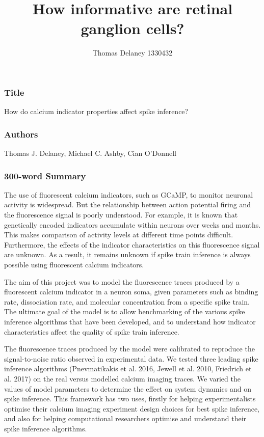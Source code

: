 \documentclass[a4paper,12pt]{article}
\title{How informative are retinal ganglion cells?}
\author{Thomas Delaney 1330432}
\theoremstyle{definition}
\begin{document}
\subsubsection*{Title}
How do calcium indicator properties affect spike inference?

\subsubsection*{Authors}
Thomas J. Delaney, Michael C. Ashby, Cian O'Donnell

\subsubsection*{300-word Summary}
The use of fluorescent calcium indicators, such as GCaMP, to monitor neuronal activity is widespread. But the relationship between action potential firing and the fluorescence signal is poorly understood. For example, it is known that genetically encoded indicators accumulate within neurons over weeks and months. This makes comparison of activity levels at different time points difficult. Furthermore, the effects of the indicator characteristics on this fluorescence signal are unknown. As a result, it remains unknown if spike train inference is always possible using fluorescent calcium indicators.

The aim of this project was to model the fluorescence traces produced by a fluorescent calcium indicator in a neuron soma, given parameters such as binding rate, dissociation rate, and molecular concentration from a specific spike train. The ultimate goal of the model is to allow benchmarking of the various spike inference algorithms that have been developed, and to understand how indicator characteristics affect the quality of spike train inference.

The fluorescence traces produced by the model were calibrated to reproduce the signal-to-noise ratio observed in experimental data. We tested three leading spike inference algorithms (Pnevmatikakis et al. 2016, Jewell et al. 2010, Friedrich et al. 2017) on the real versus modelled calcium imaging traces. We varied the values of model parameters to determine the effect on system dynamics and on spike inference. This framework has two uses, firstly for helping experimentalists optimise their calcium imaging experiment design choices for best spike inference, and also for helping computational researchers optimise and understand their spike inference algorithms.
\end{document}

